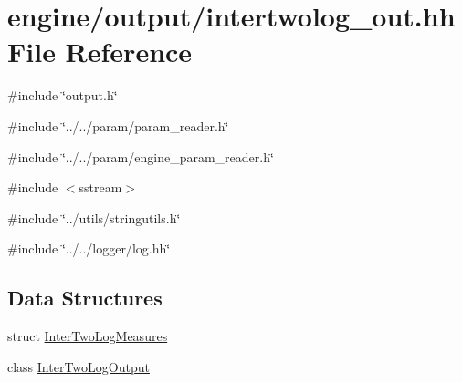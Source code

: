\hypertarget{intertwolog__out_8hh}{
\section{engine/output/intertwolog\_\-out.hh File Reference}
\label{intertwolog__out_8hh}
}
{\ttfamily \#include \char`\"{}output.h\char`\"{}}\par
{\ttfamily \#include \char`\"{}../../param/param\_\-reader.h\char`\"{}}\par
{\ttfamily \#include \char`\"{}../../param/engine\_\-param\_\-reader.h\char`\"{}}\par
{\ttfamily \#include $<$sstream$>$}\par
{\ttfamily \#include \char`\"{}../utils/stringutils.h\char`\"{}}\par
{\ttfamily \#include \char`\"{}../../logger/log.hh\char`\"{}}\par
\subsection*{Data Structures}
\begin{DoxyCompactItemize}
\item 
struct \hyperlink{structInterTwoLogMeasures}{InterTwoLogMeasures}
\item 
class \hyperlink{classInterTwoLogOutput}{InterTwoLogOutput}
\end{DoxyCompactItemize}
